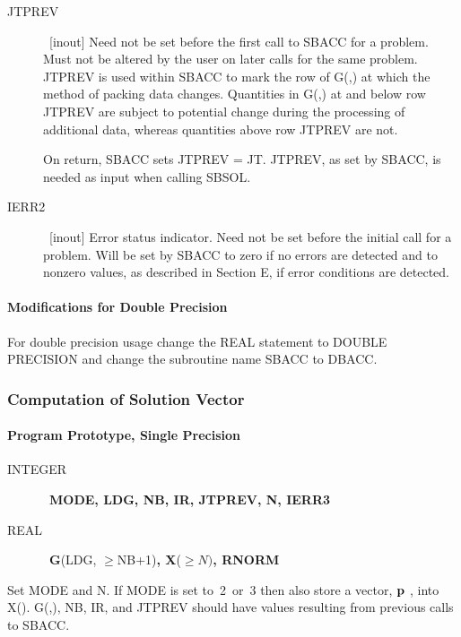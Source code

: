 \documentclass[twoside]{MATH77}
\begin{document}
\begin{description}
\item[JTPREV]  \ [inout] Need not be set before the first call to
SBACC for a problem. Must not be altered by the user on later calls
for the same problem. JTPREV is used within SBACC to mark the row of
G(,) at which the method of packing data changes. Quantities in G(,)
at and below row JTPREV are subject to potential change during the
processing of additional data, whereas quantities above row JTPREV
are not.

On return, SBACC sets JTPREV = JT.  JTPREV, as set by SBACC, is needed
as input when calling SBSOL.

\item[IERR2]  \ [inout] Error status indicator. Need not be set before the
initial call for a problem. Will be set by SBACC to zero if no errors are
detected and to nonzero values, as described in Section E, if error
conditions are detected.
\end{description}

\paragraph{Modifications for Double Precision}

For double precision usage change the REAL statement to DOUBLE PRECISION
and change the subroutine name SBACC to DBACC.

\subsubsection{Computation of Solution Vector}

\paragraph{Program Prototype, Single Precision}

\begin{description}
\item[INTEGER]  \ {\bf MODE, LDG, NB, IR, JTPREV, N, IERR3}

\item[REAL]  \ {\bf G}(LDG, $\geq $NB+1){\bf , X}($\geq N)${\bf , RNORM}
\end{description}

Set MODE and N. If MODE is set to~2~or~3 then also store a vector, ${\bf p}$%
, into X(). G(,), NB, IR, and JTPREV should have values resulting from
previous calls to SBACC.

\begin{center}
\end{center}
\end{document}
